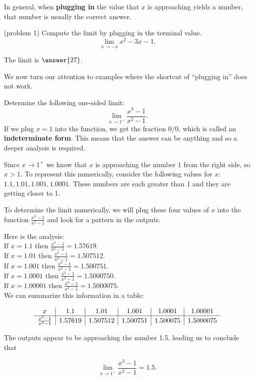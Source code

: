 \documentclass{ximera}
\begin{document}
In general, when \textbf{plugging in} the value that $x$ is approaching yields a number, 
that number is usually the correct answer.  



\begin{problem}(problem 1)
Compute the limit by plugging in the terminal value.
\[
\lim_{x \to -4} x^2 -3x -1.
\]

The limit is $\answer{27}$.
\end{problem}

We now turn our attention to examples where the shortcut of ``plugging in'' does not work.

\begin{example}[example 2]
Determine the following one-sided limit: 
\[\lim_{x \to 1^{+}} \frac{x^3 - 1}{x^2 -1}.\]
If we plug $x = 1$ into the function, we get the fraction  $0/0$, which is called an \textbf{indeterminate form}. 
This means that the answer can be anything and so a deeper analysis is required.


Since  $x \to 1^{+}$ we know that $x$ is approaching the number $1$ from the right side, so $x > 1$. 
To represent this numerically, consider the following values for $x$: $1.1, 1.01, 1.001, 1.0001$.
These numbers are each greater than 1 and they are getting closer to 1.
 
To determine the limit numerically,  we will plug these four values of $x$ into the function $\frac{x^3 - 1}{x^2-1}$ and  
look for a pattern in the outputs.

Here is the analysis:\\
If $x = 1.1$ then $\displaystyle{\frac{x^3 - 1}{x^2-1}= 1.57619}$.\\
If $x = 1.01$ then $\displaystyle{\frac{x^3 - 1}{x^2-1} = 1.507512}$.\\
If $x = 1.001$ then $\displaystyle{\frac{x^3 - 1}{x^2-1}= 1.500751}$.\\
If $x = 1.0001$ then $\displaystyle{\frac{x^3 - 1}{x^2-1}= 1.5000750}$.\\
If $x = 1.00001$ then $\displaystyle{\frac{x^3 - 1}{x^2-1}= 1.5000075}$.\\

We can summarize this information in a table:
  
\[
\begin{array}{ c | c | c | c | c | c}
  x & 1.1 & 1.01 & 1.001 & 1.0001 & 1.00001\\ 
	\hline
	\frac{x^3 - 1}{x^2-1} & 1.57619 & 1.507512 & 1.500751 & 1.500075 & 1.5000075
\end{array}
\]


The outputs appear to be approaching the number 1.5, leading us to conclude that

\[\lim_{x \to 1^+} \frac{x^3 - 1}{x^2-1} = 1.5.\] 
 
 
\end{example}
\end{document}
